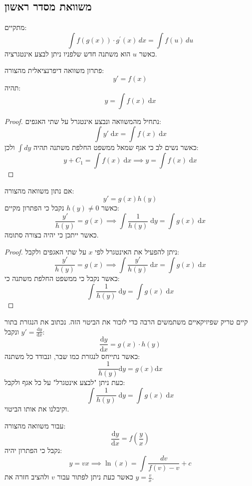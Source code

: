 \documentclass{tstextbook}
\begin{document}
\subsection{משוואת מסדר ראשון}

\begin{reminder}
מתקיים:
$$\int f(g(x))\cdot g^{\prime}(x)\,d x=\int f(u)\,d u$$
כאשר \(u\) הוא משתנה חדש שלפניו ניתן לבצע אינטגרציה.

\end{reminder}
\begin{proposition}
פתרון משוואה דיפרנציאלית מהצורה:
$$y'=f(x)$$
תהיה:
$$y=\int f(x) \;\mathrm{d}x$$

\end{proposition}
\begin{proof}
נתחיל מהמשוואה ונבצע אינטגרל על שתי האגפים:
$$\int y'\; \mathrm{d}x=\int f(x)\;\mathrm{d}x$$
כאשר נשים לב כי אגף שמאל ממשפט החלפת משתנה תהיה \(\int dy\) ולכן:
$$y+C_{1}=\int f(x)\;\mathrm{d}x\implies y = \int f(x) \;\mathrm{d} x $$

\end{proof}
\begin{proposition}
אם נתון משוואה מהצורה:
$$y' = g(x)h(y)$$
כאשר \(h(y)\neq 0\) נקבל כי הפתרון מקיים:
$$\frac{y'}{h(y)}=g(x)\implies \int \frac{1}{h(y)} \;\mathrm{d} y =\int g(x)\;\mathrm{d}x$$
כאשר ייתכן כי יהיה בצורה סתומה.

\end{proposition}
\begin{proof}
ניתן להפעיל את האינטגרל לפי \(x\) על שתי האגפים ולקבל:
$$\frac{y'}{h(y)}=g(x)\implies \int \frac{y'}{h(y)} \;\mathrm{d} x =\int g(x) \;\mathrm{d} x $$
כאשר נקבל כי ממשפט החלפת משתנה כי:
$$\int \frac{1}{h(y)} \;\mathrm{d} y =\int g(x)\;\mathrm{d}x$$

\end{proof}
\begin{remark}
קיים טריק שפיזיקאיים משתמשים הרבה כדי לזכור את הביטוי הזה. נכתוב את הנגזרת בתור \(y'=\frac{\mathrm{d} y}{\mathrm{d} x}\) ונקבל:
$$\frac{\mathrm{d} y}{\mathrm{d} x} =g(x)\cdot h(y)$$
כאשר נתייחס לנגזרת כמו שבר, ונבודד כל משתנה:
$$\frac{1}{h(y)}\mathrm{d}y=g(x)\mathrm{d}x$$
כעת ניתן "לבצע אינטגרל" על כל אגף ולקבל:
$$\int \frac{1}{h(y)} \;\mathrm{d} y =\int  g(x)\;\mathrm{d} x $$
וקיבלנו את אותו הביטוי.

\end{remark}
\begin{proposition}
עבור משוואה מהצורה:
$$\frac{\mathrm{d} y}{\mathrm{d} x} =f\left( \frac{y}{x} \right)$$
נקבל כי הפתרון יהיה:
$$y=v x\implies\ln(x)=\int{\frac{d v}{f(v)-v}}+c$$
כאשר כעת ניתן לפתור עבור \(v\) ולהציב חזרה את \(y=\frac{v}{x}\).

\end{proposition}
\end{document}
